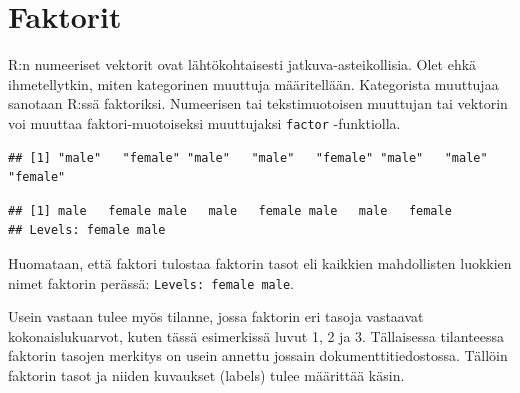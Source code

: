 \documentclass[
]{book}
\newenvironment{Shaded}{\begin{snugshade}}{\end{snugshade}}
\newcommand{\CommentTok}[1]{\textcolor[rgb]{0.56,0.35,0.01}{\textit{#1}}}
\newcommand{\FunctionTok}[1]{\textcolor[rgb]{0.00,0.00,0.00}{#1}}
\newcommand{\NormalTok}[1]{#1}
\newcommand{\OtherTok}[1]{\textcolor[rgb]{0.56,0.35,0.01}{#1}}
\newcommand{\SpecialCharTok}[1]{\textcolor[rgb]{0.00,0.00,0.00}{#1}}
\begin{document}
\hypertarget{faktorit}{%
\section{Faktorit}\label{faktorit}}

R:n numeeriset vektorit ovat lähtökohtaisesti jatkuva-asteikollisia. Olet ehkä ihmetellytkin, miten kategorinen muuttuja määritellään. Kategorista muuttujaa sanotaan R:ssä faktoriksi. Numeerisen tai tekstimuotoisen muuttujan tai vektorin voi muuttaa faktori-muotoiseksi muuttujaksi \texttt{factor} -funktiolla.

\begin{Shaded}
\end{Shaded}

\begin{verbatim}
## [1] "male"   "female" "male"   "male"   "female" "male"   "male"   "female"
\end{verbatim}

\begin{Shaded}
\end{Shaded}

\begin{verbatim}
## [1] male   female male   male   female male   male   female
## Levels: female male
\end{verbatim}

Huomataan, että faktori tulostaa faktorin tasot eli kaikkien mahdollisten luokkien nimet faktorin perässä: \texttt{Levels:\ female\ male}.

Usein vastaan tulee myös tilanne, jossa faktorin eri tasoja vastaavat kokonaislukuarvot, kuten tässä esimerkissä luvut 1, 2 ja 3. Tällaisessa tilanteessa faktorin tasojen merkitys on usein annettu jossain dokumenttitiedostossa. Tällöin faktorin tasot ja niiden kuvaukset (labels) tulee määrittää käsin.
\end{document}
